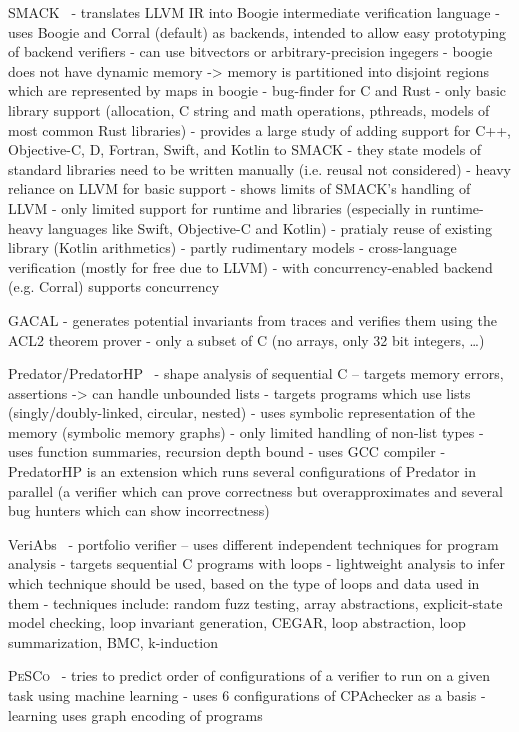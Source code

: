 SMACK~\cite{Rakamaric2014,Carter2016,Garzella2020}
- translates LLVM IR into Boogie intermediate verification language
- uses Boogie and Corral (default) as backends, intended to allow easy prototyping of backend verifiers
- can use bitvectors or arbitrary-precision ingegers
- boogie does not have dynamic memory -> memory is partitioned into disjoint regions which are represented by maps in boogie
- bug-finder for C and Rust
  - only basic library support (allocation, C string and math operations, pthreads, models of most common Rust libraries)
- \cite{Garzella2020} provides a large study of adding support for C++, Objective-C, D, Fortran, Swift, and Kotlin to SMACK
  - they state models of standard libraries need to be written manually (i.e. reusal not considered)
  - heavy reliance on LLVM for basic support
  - shows limits of SMACK's handling of LLVM
  - only limited support for runtime and libraries (especially in runtime-heavy languages like Swift, Objective-C and Kotlin)
    - pratialy reuse of existing library (Kotlin arithmetics)
    - partly rudimentary models
  - cross-language verification (mostly for free due to LLVM)
- with concurrency-enabled backend (e.g. Corral) supports concurrency

GACAL
- generates potential invariants from traces and verifies them using the ACL2 theorem prover
- only a subset of C (no arrays, only 32 bit integers, …)

Predator/PredatorHP~\cite{Peringer2020,Dudka2013}
- shape analysis of sequential C -- targets memory errors, assertions -> can handle unbounded lists
  - targets programs which use lists (singly/doubly-linked, circular, nested)
  - uses symbolic representation of the memory (symbolic memory graphs)
- only limited handling of non-list types
- uses function summaries, recursion depth bound
- uses GCC compiler
- PredatorHP is an extension which runs several configurations of Predator in parallel (a verifier which can prove correctness but overapproximates and several bug hunters which can show incorrectness)

VeriAbs~\cite{Afzal2019}
- portfolio verifier -- uses different independent techniques for program analysis
- targets sequential C programs with loops
- lightweight analysis to infer which technique should be used, based on the type of loops and data used in them
- techniques include: random fuzz testing, array abstractions, explicit-state model checking, loop invariant generation, CEGAR, loop abstraction, loop summarization, BMC, k-induction

\textsc{PeSCo}~\cite{Richter2019,Czech2017}
- tries to predict order of configurations of a verifier to run on a given task using machine learning
- uses 6 configurations of CPAchecker as a basis
- learning uses graph encoding of programs

